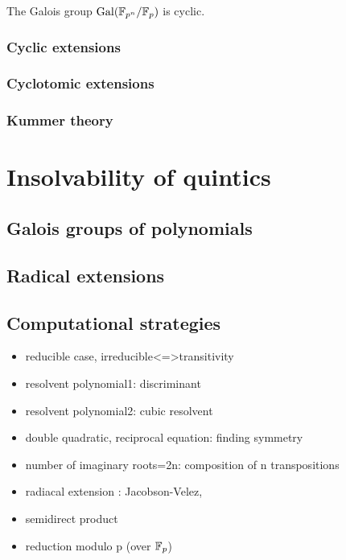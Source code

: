 \documentclass{../note}
\begin{document}
\begin{thm}
The Galois group $\operatorname{Gal}(\mathbb{F}_{p^n}/\mathbb{F}_p)$ is cyclic.
\end{thm}
\section{Cyclic extensions}
\section{Cyclotomic extensions}
\section{Kummer theory}












\part{Insolvability of quintics}
\chapter{Galois groups of polynomials}

\chapter{Radical extensions}

\chapter{Computational strategies}
\begin{itemize}
\item reducible case, irreducible<=>transitivity
\item resolvent polynomial1: discriminant
\item resolvent polynomial2: cubic resolvent
\item double quadratic, reciprocal equation: finding symmetry
\item number of imaginary roots=2n: composition of n transpositions
\item radiacal extension : Jacobson-Velez,
\item semidirect product
\item reduction modulo p (over $\mathbb{F}_p$)
\end{itemize}
\end{document}
